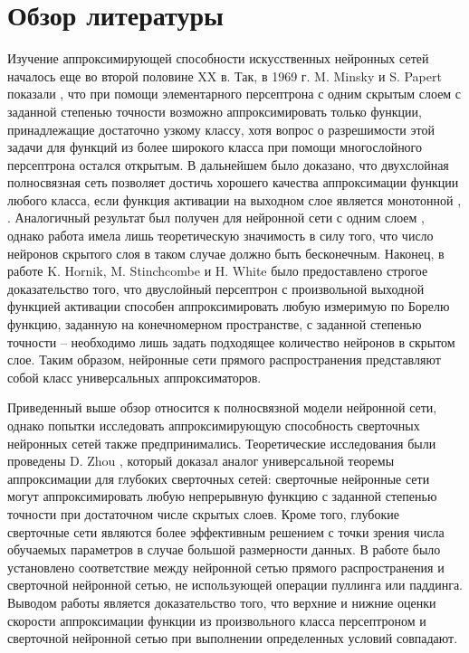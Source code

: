 \chapter{Обзор литературы}
\label{cha:Obzor}

Изучение аппроксимирующей способности искусственных нейронных сетей началось еще во второй половине XX в. Так, в 1969 г. M. Minsky и S. Papert показали \cite{MinskyPapert69}, что при помощи элементарного персептрона с одним скрытым слоем с заданной степенью точности возможно аппроксимировать только функции, принадлежащие достаточно узкому классу, хотя вопрос о разрешимости этой задачи для функций из более широкого класса при помощи многослойного персептрона остался открытым. В дальнейшем было доказано, что двухслойная полносвязная сеть позволяет достичь хорошего качества аппроксимации функции любого класса, если функция активации на выходном слое является монотонной \cite{LeCun1987}, \cite{LapedesFarber1987}. Аналогичный результат был получен для нейронной сети с одним слоем \cite{IrieMiyake88}, однако работа имела лишь теоретическую значимость в силу того, что число нейронов скрытого слоя в таком случае должно быть бесконечным. Наконец, в работе K. Hornik, M. Stinchcombe и H. White \cite{Hornik89} было предоставлено строгое доказательство того, что двуслойный персептрон с произвольной выходной функцией активации способен аппроксимировать любую измеримую по Борелю функцию, заданную на конечномерном пространстве, с заданной степенью точности – необходимо лишь задать подходящее количество нейронов в скрытом слое. Таким образом, нейронные сети прямого распространения представляют собой класс универсальных аппроксиматоров.

Приведенный выше обзор относится к полносвязной модели нейронной сети, однако попытки исследовать аппроксимирующую способность сверточных нейронных сетей также предпринимались. Теоретические исследования были проведены D. Zhou \cite{Zhou20}, который доказал аналог универсальной теоремы аппроксимации для глубоких сверточных сетей: сверточные нейронные сети могут аппроксимировать любую непрерывную функцию с заданной степенью точности при достаточном числе скрытых слоев. Кроме того, глубокие сверточные сети являются более эффективным решением с точки зрения числа обучаемых параметров в случае большой размерности данных. В работе \cite{Petersen2018EquivalenceOA} было установлено соответствие между нейронной сетью прямого распространения и сверточной нейронной сетью, не использующей операции пуллинга или паддинга. Выводом работы является доказательство того, что верхние и нижние оценки скорости аппроксимации функции из произвольного класса персептроном и сверточной нейронной сетью при выполнении определенных условий совпадают.

